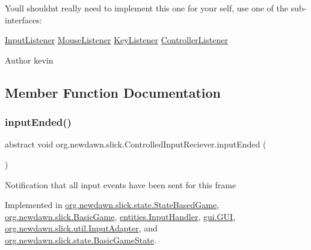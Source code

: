 You\textquotesingle{}ll shouldn\textquotesingle{}t really need to implement this one for your self, use one of the sub-\/interfaces\+:

\mbox{\hyperlink{interfaceorg_1_1newdawn_1_1slick_1_1_input_listener}{Input\+Listener}} \mbox{\hyperlink{interfaceorg_1_1newdawn_1_1slick_1_1_mouse_listener}{Mouse\+Listener}} \mbox{\hyperlink{interfaceorg_1_1newdawn_1_1slick_1_1_key_listener}{Key\+Listener}} \mbox{\hyperlink{interfaceorg_1_1newdawn_1_1slick_1_1_controller_listener}{Controller\+Listener}}

\begin{DoxyAuthor}{Author}
kevin 
\end{DoxyAuthor}


\subsection{Member Function Documentation}
\mbox{\label{interfaceorg_1_1newdawn_1_1slick_1_1_controlled_input_reciever_a61c6cde7cbf28a6969cafe3ec4f1c121}} 
\subsubsection{\texorpdfstring{input\+Ended()}{inputEnded()}}
{\footnotesize\ttfamily abstract void org.\+newdawn.\+slick.\+Controlled\+Input\+Reciever.\+input\+Ended (\begin{DoxyParamCaption}{ }\end{DoxyParamCaption})\hspace{0.3cm}{\ttfamily [abstract]}}

Notification that all input events have been sent for this frame 

Implemented in \mbox{\hyperlink{classorg_1_1newdawn_1_1slick_1_1state_1_1_state_based_game_a299be9ff0a3a53cb265ff688c19e70e9}{org.\+newdawn.\+slick.\+state.\+State\+Based\+Game}}, \mbox{\hyperlink{classorg_1_1newdawn_1_1slick_1_1_basic_game_ab1d3867ead6bd9dc922c8e90a1ccc0c3}{org.\+newdawn.\+slick.\+Basic\+Game}}, \mbox{\hyperlink{classentities_1_1_input_handler_ab5b8a1ac155983d92cdbbfa2e592654b}{entities.\+Input\+Handler}}, \mbox{\hyperlink{classgui_1_1_g_u_i_a7e5dde1e8fb225259f134f132ff9f4fb}{gui.\+G\+UI}}, \mbox{\hyperlink{classorg_1_1newdawn_1_1slick_1_1util_1_1_input_adapter_a7aeb6742cd50649e17774ccbe2ebc9ea}{org.\+newdawn.\+slick.\+util.\+Input\+Adapter}}, and \mbox{\hyperlink{classorg_1_1newdawn_1_1slick_1_1state_1_1_basic_game_state_a7bbd6fe017193ba107713e0e77c668f1}{org.\+newdawn.\+slick.\+state.\+Basic\+Game\+State}}.


